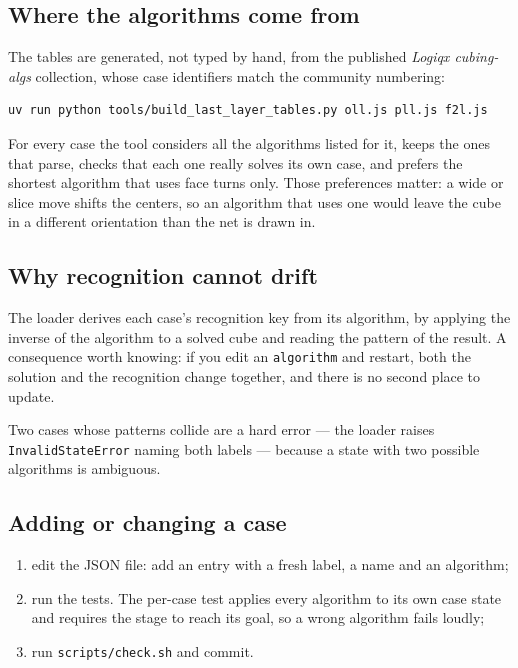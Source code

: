 \subsection{Where the algorithms come from}

The tables are generated, not typed by hand, from the published \emph{Logiqx
cubing-algs} collection, whose case identifiers match the community numbering:

\begin{lstlisting}[style=shell]
uv run python tools/build_last_layer_tables.py oll.js pll.js f2l.js
\end{lstlisting}

For every case the tool considers all the algorithms listed for it, keeps the ones
that parse, checks that each one really solves its own case, and prefers the
shortest algorithm that uses face turns only.  Those preferences matter: a wide or
slice move shifts the centers, so an algorithm that uses one would leave the cube
in a different orientation than the net is drawn in.

\subsection{Why recognition cannot drift}

The loader derives each case's recognition key from its algorithm, by applying the
inverse of the algorithm to a solved cube and reading the pattern of the result.  A
consequence worth knowing: if you edit an \texttt{algorithm} and restart, both the
solution and the recognition change together, and there is no second place to update.

Two cases whose patterns collide are a hard error --- the loader raises
\texttt{InvalidStateError} naming both labels --- because a state with two possible
algorithms is ambiguous.

\subsection{Adding or changing a case}

\begin{enumerate}[leftmargin=1.4em]
  \item edit the JSON file: add an entry with a fresh label, a name and an algorithm;
  \item run the tests.  The per-case test applies every algorithm to its own case
  state and requires the stage to reach its goal, so a wrong algorithm fails loudly;
  \item run \texttt{scripts/check.sh} and commit.
\end{enumerate}

